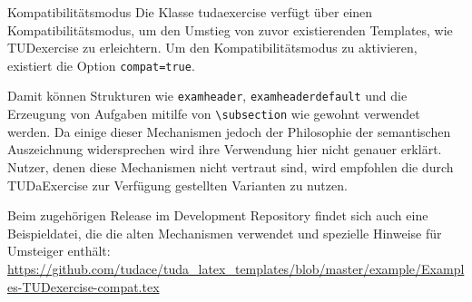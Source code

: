 \documentclass[
	german,
	points=true,%
	]{tudaexercise}
\let\code\texttt
\let\cls\textsf
\let\tbs\textbackslash
\begin{document}
\begin{task}{Kompatibilitätsmodus}
Die Klasse \cls{tudaexercise} verfügt über einen Kompatibilitätsmodus, um den Umstieg von zuvor existierenden Templates, wie TUDexercise zu erleichtern.
Um den Kompatibilitätsmodus zu aktivieren, existiert die Option \code{compat=true}.

Damit können Strukturen wie \code{examheader}, \code{examheaderdefault} und die Erzeugung von Aufgaben mitilfe von \code{\tbs{}subsection} wie gewohnt verwendet werden. Da einige dieser Mechanismen jedoch der Philosophie der semantischen Auszeichnung widersprechen wird ihre Verwendung hier nicht genauer erklärt. Nutzer, denen diese Mechanismen nicht vertraut sind, wird empfohlen die durch TUDaExercise zur Verfügung gestellten Varianten zu nutzen.

Beim zugehörigen Release im Development Repository findet sich auch eine Beispieldatei, die die alten Mechanismen verwendet und spezielle Hinweise für Umsteiger enthält: \url{https://github.com/tudace/tuda_latex_templates/blob/master/example/Examples-TUDexercise-compat.tex}
\end{task}
\end{document}
